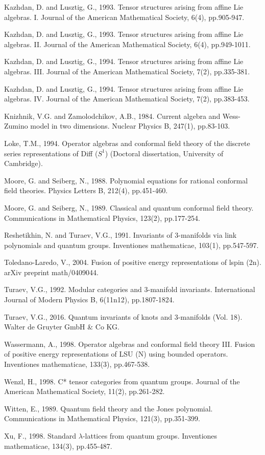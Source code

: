 \documentclass[10pt]{amsart}
\theoremstyle{definition}
\theoremstyle{plain}
\begin{document}
\begin{thebibliography}{99}
Kazhdan, D. and Lusztig, G., 1993. Tensor structures arising from affine Lie algebras. I. Journal of the American Mathematical Society, 6(4), pp.905-947.

Kazhdan, D. and Lusztig, G., 1993. Tensor structures arising from affine Lie algebras. II. Journal of the American Mathematical Society, 6(4), pp.949-1011.

Kazhdan, D. and Lusztig, G., 1994. Tensor structures arising from affine Lie algebras. III. Journal of the American Mathematical Society, 7(2), pp.335-381.

Kazhdan, D. and Lusztig, G., 1994. Tensor structures arising from affine Lie algebras. IV. Journal of the American Mathematical Society, 7(2), pp.383-453.


Knizhnik, V.G. and Zamolodchikov, A.B., 1984. Current algebra and Wess-Zumino model in two dimensions. Nuclear Physics B, 247(1), pp.83-103.

Loke, T.M., 1994. Operator algebras and conformal field theory of the discrete series representations of Diff ($S^1$) (Doctoral dissertation, University of Cambridge).


Moore, G. and Seiberg, N., 1988. Polynomial equations for rational conformal field theories. Physics Letters B, 212(4), pp.451-460.

Moore, G. and Seiberg, N., 1989. Classical and quantum conformal field theory. Communications in Mathematical Physics, 123(2), pp.177-254.

Reshetikhin, N. and Turaev, V.G., 1991. Invariants of 3-manifolds via link polynomials and quantum groups. Inventiones mathematicae, 103(1), pp.547-597.

Toledano-Laredo, V., 2004. Fusion of positive energy representations of lspin (2n). arXiv preprint math/0409044.

Turaev, V.G., 1992. Modular categories and 3-manifold invariants. International Journal of Modern Physics B, 6(11n12), pp.1807-1824.

Turaev, V.G., 2016. Quantum invariants of knots and 3-manifolds (Vol. 18). Walter de Gruyter GmbH \& Co KG.


Wassermann, A., 1998. Operator algebras and conformal field theory III. Fusion of positive energy representations of LSU (N) using bounded operators. Inventiones mathematicae, 133(3), pp.467-538.

Wenzl, H., 1998. C* tensor categories from quantum groups. Journal of the American Mathematical Society, 11(2), pp.261-282.

Witten, E., 1989. Quantum field theory and the Jones polynomial. Communications in Mathematical Physics, 121(3), pp.351-399.

Xu, F., 1998. Standard $\lambda$-lattices from quantum groups. Inventiones mathematicae, 134(3), pp.455-487.
	
\end{thebibliography}
\end{document}
